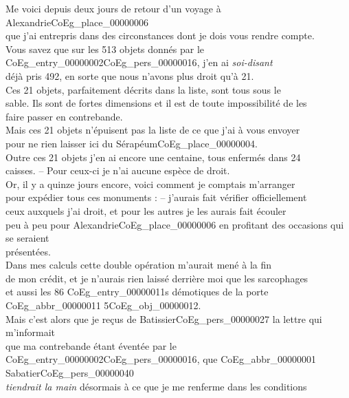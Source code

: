 \documentclass{book}
\begin{document}
Me voici depuis deux jours de retour d’un voyage à Alexandrie\gls{CoEg_place_00000006}\\
que j’ai entrepris dans des circonstances dont je dois vous rendre compte.\\
\indent Vous savez que sur les 513 objets donnés par le \Gls{CoEg_entry_00000002}\gls{CoEg_pers_00000016}, j’en ai \textit{soi-disant}\\
déjà pris 492, en sorte que nous n’avons plus droit qu’à 21.\\
\indent Ces 21 objets, parfaitement décrits dans la liste, sont tous sous le\\
sable. Ils sont de fortes dimensions et il est de toute impossibilité de les\\
faire passer en contrebande.\\
\indent Mais ces 21 objets n’épuisent pas la liste de ce que j’ai à vous envoyer\\
pour ne rien laisser ici du Sérapéum\gls{CoEg_place_00000004}.\\
\indent Outre ces 21 objets j’en ai encore une centaine, tous enfermés dans 24\\
caisses. – Pour ceux-ci je n’ai aucune espèce de droit.\\
\indent Or, il y a quinze jours encore, voici comment je comptais m’arranger\\
pour expédier tous ces monuments : – j’aurais fait vérifier officiellement\\
ceux auxquels j’ai droit, et pour les autres je les aurais fait écouler\\
peu à peu pour Alexandrie\gls{CoEg_place_00000006} en profitant des occasions qui se seraient\\
présentées.\\
\indent Dans mes calculs cette double opération m’aurait mené à la fin\\
de mon crédit, et je n’aurais rien laissé derrière moi que les sarcophages\\
et aussi les 86 \glspl{CoEg_entry_00000011} démotiques de la porte \gls{CoEg_abbr_00000011} 5\gls{CoEg_obj_00000012}.\\
\indent Mais c’est alors que je reçus de Batissier\gls{CoEg_pers_00000027} la lettre qui m’informait\\
que ma contrebande étant éventée par le \Gls{CoEg_entry_00000002}\gls{CoEg_pers_00000016}, que \gls{CoEg_abbr_00000001} Sabatier\gls{CoEg_pers_00000040}\\
\textit{tiendrait la main} désormais à ce que je me renferme dans les conditions
\end{document}
